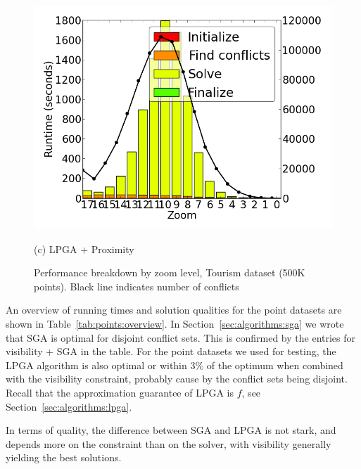 \begin{figure}[tb]
\begin{minipage}{0.329\linewidth}
    \centerline{\includegraphics[width=1.0\linewidth]{./figs/prelim_pnt_500k_tourism_lp_B.png}}
    \centerline{(c) LPGA + Proximity}
  \end{minipage}
  \vspace{-0ex}
  \caption{Performance breakdown by zoom level, Tourism dataset (500K points). Black line indicates number of conflicts} \label{fig:performance:tourism}
  \vspace{-2ex}
\end{figure}

An overview of running times and solution qualities for the point datasets are shown in Table~\ref{tab:points:overview}. In Section~\ref{sec:algorithms:sga} we wrote that SGA is optimal for disjoint conflict sets. This is confirmed by the entries for visibility + SGA in the table. For the point datasets we used for testing, the LPGA algorithm is also optimal or within $3\%$ of the optimum when combined with the visibility constraint, probably cause by the conflict sets being disjoint. Recall that the approximation guarantee of LPGA is $f$, see Section~\ref{sec:algorithms:lpga}.

In terms of quality, the difference between SGA and LPGA is not stark, and depends more on the constraint than on the solver, with visibility generally yielding the best solutions.

